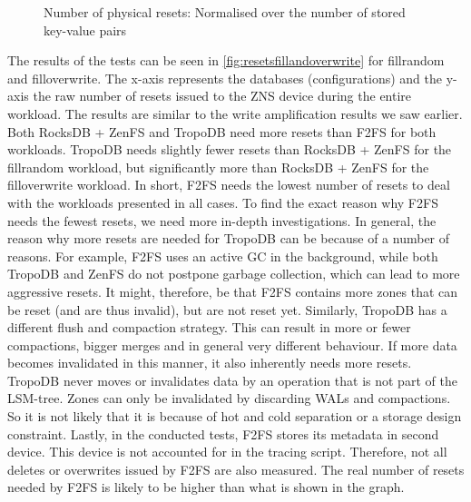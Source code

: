 \begin{figure}[!ht]
    \hspace*{-0.075\textwidth} %
    \raggedleft
    \caption{ Number of physical resets: Normalised over the number of stored key-value pairs }
    \label{fig:resetsfillandoverwrite}
\end{figure}

The results of the tests can be seen in \autoref{fig:resetsfillandoverwrite} for fillrandom and filloverwrite. The x-axis represents the databases (configurations) and the y-axis the raw number of resets issued to the ZNS device during the entire workload. The results are similar to the write amplification results we saw earlier. Both RocksDB + ZenFS and TropoDB need more resets than F2FS for both workloads. TropoDB needs slightly fewer resets than RocksDB + ZenFS for the fillrandom workload, but significantly more than RocksDB + ZenFS for the filloverwrite workload. In short, F2FS needs the lowest number of resets to deal with the workloads presented in all cases.  To find the exact reason why F2FS needs the fewest resets, we need more in-depth investigations. In general, the reason why more resets are needed for TropoDB can be because of a number of reasons. For example, F2FS uses an active GC in the background, while both TropoDB and ZenFS do not postpone garbage collection, which can lead to more aggressive resets. It might, therefore, be that F2FS contains more zones that can be reset (and are thus invalid), but are not reset yet. Similarly, TropoDB has a different flush and compaction strategy. This can result in more or fewer compactions, bigger merges and in general very different behaviour. If more data becomes invalidated in this manner, it also inherently needs more resets. TropoDB never moves or invalidates data by an operation that is not part of the LSM-tree. Zones can only be invalidated by discarding WALs and compactions. So it is not likely that it is because of hot and cold separation or a storage design constraint. Lastly, in the conducted tests, F2FS stores its metadata in second device. This device is not accounted for in the tracing script. Therefore, not all deletes or overwrites issued by F2FS are also measured. The real number of resets needed by F2FS is likely to be higher than what is shown in the graph. 


